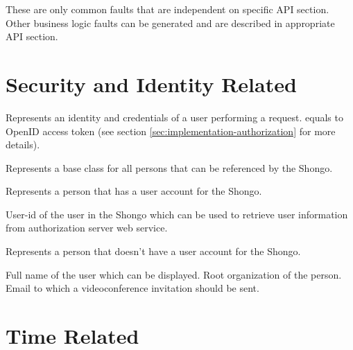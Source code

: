 These are only common faults that are independent on specific API section. Other business logic faults can be generated and are described in appropriate API section.


\section{Security and Identity Related}

\begin{Api}

Represents an identity and credentials of a user performing a request.  equals to OpenID \cite{openid} access token (see section \ref{sec:implementation-authorization} for more details).

Represents a base class for all persons that can be referenced by the Shongo.

Represents a person that has a user account for the Shongo.
\begin{ApiClassAttributes}
 User-id of the user in the Shongo which can be used to retrieve user information from authorization server web service.
\end{ApiClassAttributes}

Represents a person that doesn't have a user account for the Shongo.
\begin{ApiClassAttributes}
 Full name of the user which can be displayed.
 Root organization of the person.
 Email to which a videoconference invitation should be sent.
\end{ApiClassAttributes}

\end{Api}


\section{Time Related}

